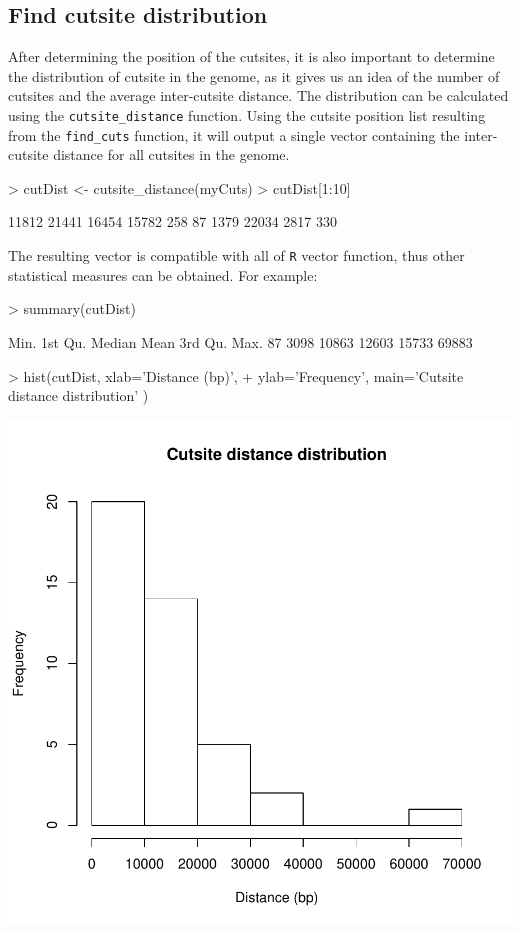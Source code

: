 \documentclass{article}
\begin{document}
\subsection{Find cutsite distribution}
After determining the position of the cutsites, it is also important to determine the distribution of cutsite in the genome, as it gives us an idea of the number of cutsites and the average inter-cutsite distance. The distribution can be calculated using the \texttt{cutsite\_distance} function. Using the cutsite position list resulting from the \texttt{find\_cuts} function, it will output a single vector containing the inter-cutsite distance for all cutsites in the genome.
\begin{Schunk}
\begin{Sinput}
> cutDist <- cutsite_distance(myCuts)
> cutDist[1:10]
\end{Sinput}
\begin{Soutput}
 [1] 11812 21441 16454 15782   258    87  1379 22034  2817   330
\end{Soutput}
\end{Schunk}
The resulting vector is compatible with all of \texttt{R} vector function, thus other statistical measures can be obtained. For example:
\begin{Schunk}
\begin{Sinput}
> summary(cutDist)
\end{Sinput}
\begin{Soutput}
   Min. 1st Qu.  Median    Mean 3rd Qu.    Max. 
     87    3098   10863   12603   15733   69883 
\end{Soutput}
\begin{Sinput}
> hist(cutDist, xlab='Distance (bp)', 
+      ylab='Frequency', main='Cutsite distance distribution' )
\end{Sinput}
\end{Schunk}
\includegraphics{Tutorial_for_RADseq_Tools-010}
\end{document}
